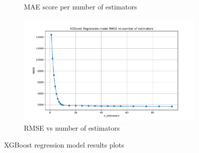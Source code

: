 \begin{figure}[!htbp]
\begin{subfigure}[b]{0.49\textwidth}
        \caption{MAE score per number of estimators}
        \label{fig: XGBoost N estimators vs MAE} 
    \end{subfigure}
    \hfill
    \begin{subfigure}[b]{0.49\textwidth}
        \includegraphics[width=\textwidth]{../regression_model/plots/XGB/XGBoost Regression model RMSE vs n_estimators.pdf}
        \caption{RMSE vs number of estimators}
        \label{fig: XGBoost N estimators vs RMSE}
    \end{subfigure}
    \caption[XGBoost metric results]{XGBoost regression model results plots}
    \label{fig: XGBoost estimators vs results}
\end{figure}
